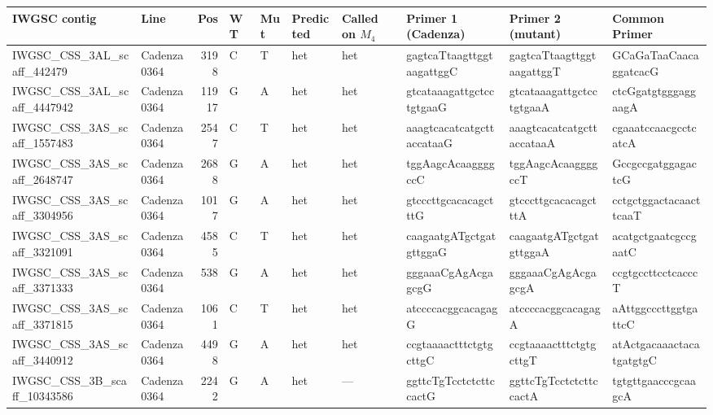 \begin{tabular}{llrlllllll}
\toprule
IWGSC contig                 & Line       &   Pos & WT   & Mut   & Predicted   & Called on $M_{4}$    & Primer 1 (Cadenza)        & Primer 2 (mutant)         & Common Primer             \\
\midrule
 IWGSC\_CSS\_3AL\_scaff\_442479   & Cadenza0364 &       3198 & C         & T        & het            & het         & gagtcaTtaagttggtaagattggC & gagtcaTtaagttggtaagattggT & GCaGaTaaCaacaggatcacG     \\
 IWGSC\_CSS\_3AL\_scaff\_4447942  & Cadenza0364 &      11917 & G         & A        & het            & het         & gtcataaagattgctcctgtgaaG  & gtcataaagattgctcctgtgaaA  & ctcGgatgtgggaggaagA       \\
 IWGSC\_CSS\_3AS\_scaff\_1557483  & Cadenza0364 &       2547 & C         & T        & het            & het         & aaagtcacatcatgcttaccataaG & aaagtcacatcatgcttaccataaA & cgaaatccaacgcctcatcA      \\
 IWGSC\_CSS\_3AS\_scaff\_2648747  & Cadenza0364 &       2688 & G         & A        & het            & het         & tggAagcAcaaggggccC        & tggAagcAcaaggggccT        & GccgccgatggagactcG        \\
 IWGSC\_CSS\_3AS\_scaff\_3304956  & Cadenza0364 &       1017 & G         & A        & het            & het         & gtcccttgcacacagctttG      & gtcccttgcacacagctttA      & cctgctggactacaacttcaaT    \\
 IWGSC\_CSS\_3AS\_scaff\_3321091  & Cadenza0364 &       4585 & C         & T        & het            & het         & caagaatgATgctgatgttggaG   & caagaatgATgctgatgttggaA   & acatgctgaatcgccgaatC      \\
 IWGSC\_CSS\_3AS\_scaff\_3371333  & Cadenza0364 &        538 & G         & A        & het            & het         & gggaaaCgAgAcgagcgG        & gggaaaCgAgAcgagcgA        & ccgtgccttcctcacccT        \\
 IWGSC\_CSS\_3AS\_scaff\_3371815  & Cadenza0364 &       1061 & C         & T        & het            & het         & atccccacggcacagagG        & atccccacggcacagagA        & aAttggcccttggtgattcC      \\
 IWGSC\_CSS\_3AS\_scaff\_3440912  & Cadenza0364 &       4498 & G         & A        & het            & het         & ccgtaaaactttctgtgcttgC    & ccgtaaaactttctgtgcttgT    & atActgacaaactacatgatgtgC  \\
 IWGSC\_CSS\_3B\_scaff\_10343586  & Cadenza0364 &       2242 & G         & A        & het            & ---         & ggttcTgTcctctcttccactG    & ggttcTgTcctctcttccactA    & tgtgttgaacccgcaagcA       \\

\end{tabular}
